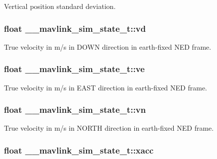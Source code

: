Vertical position standard deviation. 

\hypertarget{struct____mavlink__sim__state__t_a057f5299b9dbad10fac6b7fce523aad7}{
\subsubsection[{vd}]{\setlength{\rightskip}{0pt plus 5cm}float \+\_\+\+\_\+mavlink\+\_\+sim\+\_\+state\+\_\+t\+::vd}}\label{struct____mavlink__sim__state__t_a057f5299b9dbad10fac6b7fce523aad7}


True velocity in m/s in D\+O\+W\+N direction in earth-\/fixed N\+E\+D frame. 

\hypertarget{struct____mavlink__sim__state__t_a1cf4dd8696eabaee1a9817bc5cae8cf1}{
\subsubsection[{ve}]{\setlength{\rightskip}{0pt plus 5cm}float \+\_\+\+\_\+mavlink\+\_\+sim\+\_\+state\+\_\+t\+::ve}}\label{struct____mavlink__sim__state__t_a1cf4dd8696eabaee1a9817bc5cae8cf1}


True velocity in m/s in E\+A\+S\+T direction in earth-\/fixed N\+E\+D frame. 

\hypertarget{struct____mavlink__sim__state__t_a7a3506208fd5f6d14bd68fc39f6f1f04}{
\subsubsection[{vn}]{\setlength{\rightskip}{0pt plus 5cm}float \+\_\+\+\_\+mavlink\+\_\+sim\+\_\+state\+\_\+t\+::vn}}\label{struct____mavlink__sim__state__t_a7a3506208fd5f6d14bd68fc39f6f1f04}


True velocity in m/s in N\+O\+R\+T\+H direction in earth-\/fixed N\+E\+D frame. 

\hypertarget{struct____mavlink__sim__state__t_a9d04a947d145cbdbf3bfc5ca28f65057}{
\subsubsection[{xacc}]{\setlength{\rightskip}{0pt plus 5cm}float \+\_\+\+\_\+mavlink\+\_\+sim\+\_\+state\+\_\+t\+::xacc}}\label{struct____mavlink__sim__state__t_a9d04a947d145cbdbf3bfc5ca28f65057}


